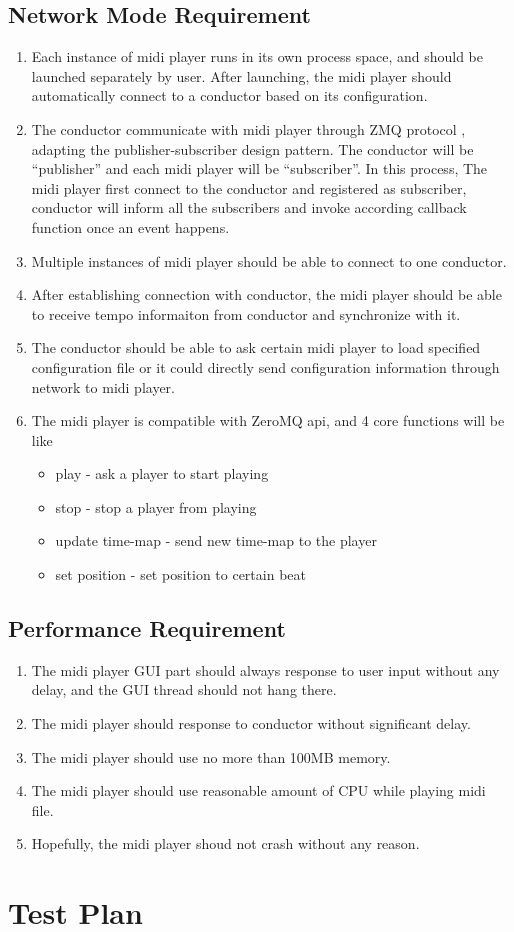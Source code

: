 \subsection{Network Mode Requirement}
\begin{enumerate}
  \item Each instance of midi player runs in its own process space, and 
        should be launched separately by user. After launching, the midi 
        player should automatically connect to a conductor based on its configuration.
  \item The conductor communicate with midi player through ZMQ protocol \cite{ZMQ}, 
        adapting the publisher-subscriber design pattern. The conductor will 
        be ``publisher'' and each midi player will be ``subscriber''. In this process, 
        The midi player first connect to the conductor and registered as subscriber, 
        conductor will inform all the 
        subscribers and invoke according callback function once an event happens.

  \item Multiple instances of midi player should be able to connect to one conductor. 
  \item After establishing connection with conductor, the midi player 
    should be able to receive tempo informaiton 
        from conductor and synchronize with it.     
  \item The conductor should be able to ask certain midi player to 
    load specified configuration file or it could directly 
        send configuration information through network to midi player.
  \item 
    The midi player is compatible with ZeroMQ \cite{zeromq} api, 
    and 4 core functions will be like
    \begin{itemize}
      \item play - ask a player to start playing 
      \item stop - stop a player from playing 
      \item update time-map - send new time-map to the player 
      \item set position - set position to certain beat 
    \end{itemize}
\end{enumerate}

\subsection{Performance Requirement}
\begin{enumerate}
  \item The midi player GUI part should always response to user input without 
        any delay, and the GUI thread should not hang there.
  \item The midi player should response to conductor without significant delay.
  \item The midi player should use no more than 100MB memory.
  \item The midi player should use reasonable amount of CPU while playing midi file.
  \item Hopefully, the midi player shoud not crash without any reason. 
\end{enumerate}

\section{Test Plan}

